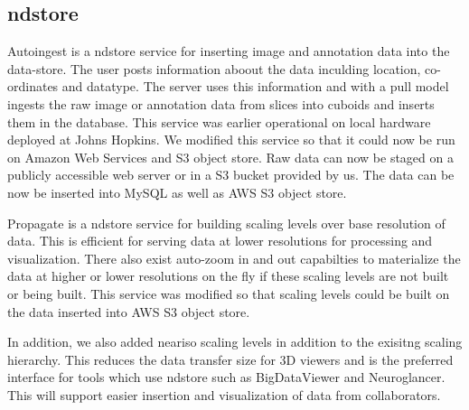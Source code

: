 \documentclass[simplex.tex]{subfiles}
\begin{document}
\subsection{ndstore}
%
%
Autoingest is a ndstore service for inserting image and annotation data into the data-store. The user posts information aboout the data inculding location, co-ordinates and datatype. The server uses this information and with a pull model ingests the raw image or annotation data from slices into cuboids and inserts them in the database. This service was earlier operational on local hardware deployed at Johns Hopkins. We modified this service so that it could now be run on Amazon Web Services and S3 object store. Raw data can now be staged on a publicly accessible web server or in a S3 bucket provided by us. The data can be now be inserted into MySQL as well as AWS S3 object store. \par

Propagate is a ndstore service for building scaling levels over base resolution of data. This is efficient for serving data at lower resolutions for processing and visualization. There also exist auto-zoom in and out capabilties to materialize the data at higher or lower resolutions on the fly if these scaling levels are not built or being built. This service was modified so that scaling levels could be built on the data inserted into AWS S3 object store. \par

In addition, we also added neariso scaling levels in addition to the exisitng scaling hierarchy. This reduces the data transfer size for 3D viewers and is the preferred interface for tools which use ndstore such as BigDataViewer and Neuroglancer. This will support easier insertion and visualization of data from collaborators. \par

%
\end{document}
